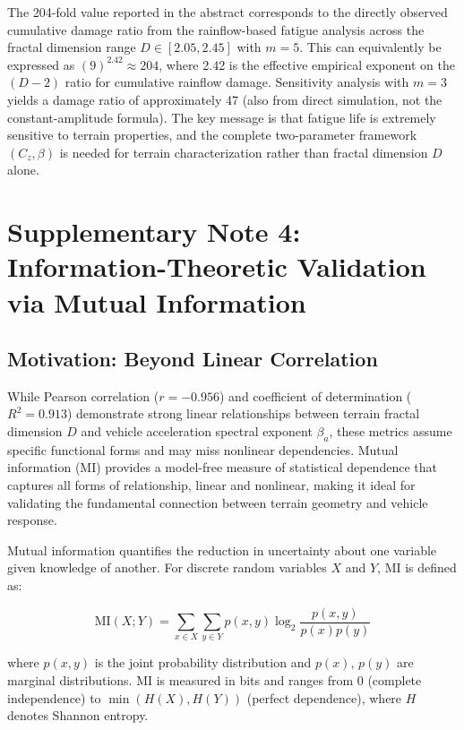 \documentclass[11pt]{article}
\begin{document}
The 204-fold value reported in the abstract corresponds to the directly observed cumulative damage ratio from the rainflow-based fatigue analysis across the fractal dimension range $D \in [2.05, 2.45]$ with $m = 5$. This can equivalently be expressed as $(9)^{2.42} \approx 204$, where 2.42 is the effective empirical exponent on the $(D-2)$ ratio for cumulative rainflow damage. Sensitivity analysis with $m = 3$ yields a damage ratio of approximately 47 (also from direct simulation, not the constant-amplitude formula). The key message is that fatigue life is extremely sensitive to terrain properties, and the complete two-parameter framework $(C_z, \beta)$ is needed for terrain characterization rather than fractal dimension $D$ alone.

\section{Supplementary Note 4: Information-Theoretic Validation via Mutual Information}

\subsection{Motivation: Beyond Linear Correlation}

While Pearson correlation ($r = -0.956$) and coefficient of determination ($R^2 = 0.913$) demonstrate strong linear relationships between terrain fractal dimension $D$ and vehicle acceleration spectral exponent $\beta_a$, these metrics assume specific functional forms and may miss nonlinear dependencies. Mutual information (MI) provides a model-free measure of statistical dependence that captures all forms of relationship, linear and nonlinear, making it ideal for validating the fundamental connection between terrain geometry and vehicle response\cite{Cover2006}.

Mutual information quantifies the reduction in uncertainty about one variable given knowledge of another. For discrete random variables $X$ and $Y$, MI is defined as:

\begin{equation}
\text{MI}(X;Y) = \sum_{x \in X} \sum_{y \in Y} p(x,y) \log_2 \frac{p(x,y)}{p(x)p(y)}
\end{equation}

where $p(x,y)$ is the joint probability distribution and $p(x)$, $p(y)$ are marginal distributions. MI is measured in bits and ranges from 0 (complete independence) to $\min(H(X), H(Y))$ (perfect dependence), where $H$ denotes Shannon entropy.
\end{document}
